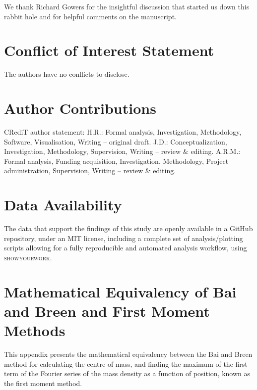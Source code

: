 \documentclass[reprint,superscriptaddress,nobibnotes,amsmath,amssymb,aip]{revtex4-2}
\begin{document}
\begin{acknowledgements}
We thank Richard Gowers for the insightful discussion that started us down this rabbit hole and for helpful comments on the manuscript.
\end{acknowledgements}

\section*{Conflict of Interest Statement}

The authors have no conflicts to disclose.

\section*{Author Contributions}
CRediT author statement: 
H.R.: Formal analysis, Investigation, Methodology, Software, Visualisation, Writing – original draft.
J.D.: Conceptualization, Investigation, Methodology, Supervision, Writing – review \& editing.
A.R.M.: Formal analysis, Funding acquisition, Investigation, Methodology, Project administration, Supervision, Writing – review \& editing.

\section*{Data Availability}

The data that support the findings of this study are openly available in a GitHub repository\cite{richardson_github_2025}, under an MIT license, including a complete set of analysis/plotting scripts allowing for a fully reproducible and automated analysis workflow, using \textsc{showyourwork}\cite{luger_showyourwork_2021}.

\appendix

\section{Mathematical Equivalency of Bai and Breen and First Moment Methods}
\label{app:math}

This appendix presents the mathematical equivalency between the Bai and Breen method for calculating the centre of mass, and finding the maximum of the first term of the Fourier series of the mass density as a function of position, known as the first moment method.\cite{teague_robust_2018}
\end{document}
